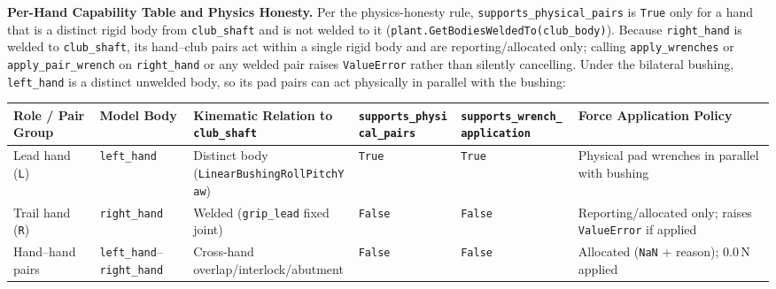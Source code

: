 \documentclass[11pt,a4paper]{article}
\begin{document}
\textbf{Per-Hand Capability Table and Physics Honesty.}
Per the physics-honesty rule, \texttt{supports\_physical\_pairs} is \texttt{True} only for a hand that is a distinct rigid body from \texttt{club\_shaft} and is not welded to it (\texttt{plant.GetBodiesWeldedTo(club\_body)}). Because \texttt{right\_hand} is welded to \texttt{club\_shaft}, its hand--club pairs act within a single rigid body and are reporting/allocated only; calling \texttt{apply\_wrenches} or \texttt{apply\_pair\_wrench} on \texttt{right\_hand} or any welded pair raises \texttt{ValueError} rather than silently cancelling. Under the bilateral bushing, \texttt{left\_hand} is a distinct unwelded body, so its pad pairs can act physically in parallel with the bushing:
\begin{center}
\begin{tabular}{llllll}
\toprule
Role / Pair Group & Model Body & Kinematic Relation to \texttt{club\_shaft} & \texttt{supports\_physical\_pairs} & \texttt{supports\_wrench\_application} & Force Application Policy \\
\midrule
Lead hand (\texttt{L}) & \texttt{left\_hand} & Distinct body (\texttt{LinearBushingRollPitchYaw}) & \texttt{True} & \texttt{True} & Physical pad wrenches in parallel with bushing \\
Trail hand (\texttt{R}) & \texttt{right\_hand} & Welded (\texttt{grip\_lead} fixed joint) & \texttt{False} & \texttt{False} & Reporting/allocated only; raises \texttt{ValueError} if applied \\
Hand--hand pairs & \texttt{left\_hand}--\texttt{right\_hand} & Cross-hand overlap/interlock/abutment & \texttt{False} & \texttt{False} & Allocated (\texttt{NaN} + reason); $0.0\,\mathrm{N}$ applied \\
\bottomrule
\end{tabular}
\end{center}
\end{document}

